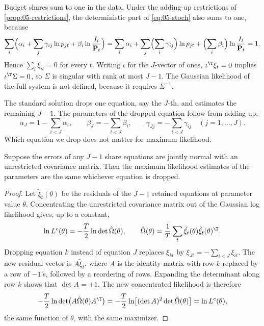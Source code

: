 Budget shares sum to one in the data. Under the adding-up restrictions of \cref{prop:05-restrictions},
the deterministic part of \eqref{eq:05-stoch} also sums to one, because
\begin{equation*}
  \sum_i\Bigl(\alpha_i + \sum_j\gamma_{ij}\ln p_{jt} + \beta_i\ln\frac{I_t}{\mathbf{P}_t}\Bigr)
  = \sum_i\alpha_i + \sum_j\Bigl(\sum_i\gamma_{ij}\Bigr)\ln p_{jt} + \Bigl(\sum_i\beta_i\Bigr)
    \ln\frac{I_t}{\mathbf{P}_t} = 1 .
\end{equation*}
Hence $\sum_i\xi_{it} = 0$ for every $t$. Writing $\iota$ for the $J$-vector of ones, $\iota^{\T}\xi_t = 0$
implies $\iota^{\T}\Sigma = 0$, so $\Sigma$ is singular with rank at most $J - 1$. The Gaussian likelihood
of the full system is not defined, because it requires $\Sigma^{-1}$.

The standard solution drops one equation, say the $J$-th, and estimates the remaining $J - 1$. The
parameters of the dropped equation follow from adding up:
\begin{equation*}
  \alpha_J = 1 - \sum_{i<J}\alpha_i, \qquad \beta_J = -\sum_{i<J}\beta_i, \qquad
  \gamma_{Jj} = -\sum_{i<J}\gamma_{ij} \quad (j = 1, \dots, J).
\end{equation*}
Which equation we drop does not matter for maximum likelihood.

\begin{proposition}\label{prop:05-barten}
Suppose the errors of any $J-1$ share equations are jointly normal with an unrestricted covariance matrix.
Then the maximum likelihood estimates of the parameters are the same whichever equation is dropped.
\end{proposition}

\begin{proof}
Let $\tilde\xi_t(\theta)$ be the residuals of the $J-1$ retained equations at parameter value $\theta$.
Concentrating the unrestricted covariance matrix out of the Gaussian log likelihood gives, up to a
constant,
\begin{equation*}
  \ln L^c(\theta) = -\frac{T}{2}\ln\det\hat\Omega(\theta), \qquad
  \hat\Omega(\theta) = \frac{1}{T}\sum_t\tilde\xi_t(\theta)\tilde\xi_t(\theta)^{\T}.
\end{equation*}
Dropping equation $k$ instead of equation $J$ replaces $\xi_{kt}$ by $\xi_{Jt} = -\sum_{i<J}\xi_{it}$. The
new residual vector is $A\tilde\xi_t$, where $A$ is the identity matrix with row $k$ replaced by a row of
$-1$'s, followed by a reordering of rows. Expanding the determinant along row $k$ shows that $\det A =
\pm 1$. The new concentrated likelihood is therefore
\begin{equation*}
  -\frac{T}{2}\ln\det\bigl(A\hat\Omega(\theta)A^{\T}\bigr)
  = -\frac{T}{2}\ln\bigl[(\det A)^2\det\hat\Omega(\theta)\bigr] = \ln L^c(\theta),
\end{equation*}
the same function of $\theta$, with the same maximizer.
\end{proof}

